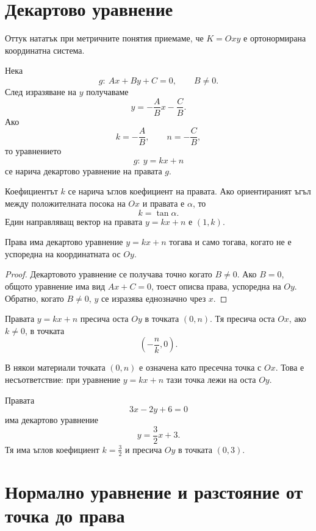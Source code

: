 \section{Декартово уравнение}\label{s:28.4}

Оттук нататък при метричните понятия приемаме, че $K=Oxy$ е
ортонормирана координатна система.

\begin{defn}
Нека
\[
 g:\ Ax+By+C=0,\qquad B\neq0.
\]
След изразяване на $y$ получаваме
\[
 y=-\frac ABx-\frac CB.
\]
Ако
\[
 k=-\frac AB,\qquad n=-\frac CB,
\]
то уравнението
\[
 g:\ y=kx+n
\]
се нарича декартово уравнение на правата $g$.
\end{defn}

Коефициентът $k$ се нарича ъглов коефициент на правата. Ако
ориентираният ъгъл между положителната посока на $Ox$ и правата е
$\alpha$, то
\[
 k=\tan\alpha.
\]
Един направляващ вектор на правата $y=kx+n$ е $(1,k)$.

\begin{prop}
Права има декартово уравнение $y=kx+n$ тогава и само тогава, когато не
е успоредна на координатната ос $Oy$.
\end{prop}

\begin{proof}
Декартовото уравнение се получава точно когато $B\neq0$. Ако $B=0$,
общото уравнение има вид $Ax+C=0$, тоест описва права, успоредна на
$Oy$. Обратно, когато $B\neq0$, $y$ се изразява еднозначно чрез $x$.
\end{proof}

\begin{remark}
Правата $y=kx+n$ пресича оста $Oy$ в точката $(0,n)$. Тя пресича
оста $Ox$, ако $k\neq0$, в точката
\[
 \left(-\frac nk,0\right).
\]
\end{remark}

\begin{supp}[Бележка]
В някои материали точката $(0,n)$ е означена като пресечна точка с
$Ox$. Това е несъответствие: при уравнение $y=kx+n$ тази точка лежи на
оста $Oy$.
\end{supp}

\begin{example}
Правата
\[
 3x-2y+6=0
\]
има декартово уравнение
\[
 y=\frac32x+3.
\]
Тя има ъглов коефициент $k=\frac32$ и пресича $Oy$ в точката $(0,3)$.
\end{example}

\section{Нормално уравнение и разстояние от точка до права}\label{s:28.5}

